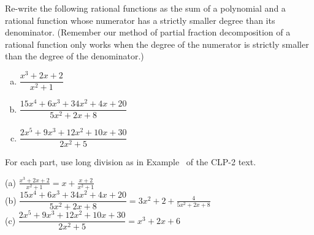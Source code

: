 
\begin{Mquestion}
Re-write the following rational functions as the sum of a polynomial and a rational function whose numerator has a strictly smaller degree than its denominator. (Remember our method of partial fraction decomposition of a rational function only works when the degree of the numerator is strictly smaller than the degree of the denominator.)
\begin{enumerate}[(a)]
\item $\dfrac{x^3+2x+2}{x^2+1}$
\item $\dfrac{15x^4+6x^3+34x^2+4x+20}{5x^2+2x+8}$
\item $\dfrac{2x^5+9x^3+12x^2+10x+30}{2x^2+5}$
\end{enumerate}

\end{Mquestion}
\begin{hint}
For each part,  use long division as in Example~ of the CLP-2 text.
\end{hint}
\begin{answer}
(a) $\displaystyle\frac{x^3+2x+2}{x^2+1} = x+\frac{x+2}{x^2+1}$\\[10pt]
(b) $\displaystyle\dfrac{15x^4+6x^3+34x^2+4x+20}{5x^2+2x+8} = 3x^2+2+\frac{4}{5x^2+2x+8}$\\[10pt]
(c) $\displaystyle\dfrac{2x^5+9x^3+12x^2+10x+30}{2x^2+5}=x^3+2x+6$
\end{answer}
